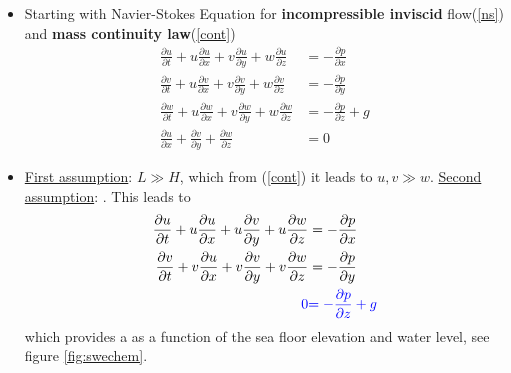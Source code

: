 \begin{frame}
\vspace{-3mm}
\begin{itemize}
\item<2-> Starting with Navier-Stokes Equation for \textbf{incompressible inviscid} flow(\ref{ns}) and \textbf{mass continuity law}(\ref{cont})
\begin{align}
\frac{\partial u}{\partial t} + u\frac{\partial u}{\partial x} + v\frac{\partial u}{\partial y} + w\frac{\partial u}{\partial z} &= - \frac{\partial p}{\partial x} \nonumber \\ 
\frac{\partial v}{\partial t} + u\frac{\partial v}{\partial x} + v\frac{\partial v}{\partial y} + w\frac{\partial v}{\partial z}&= - \frac{\partial p}{\partial y} \label{ns} \\ 
\frac{\partial w}{\partial t} + u\frac{\partial w}{\partial x} + v\frac{\partial w}{\partial y} + w\frac{\partial w}{\partial z} &= - \frac{\partial p}{\partial z} + g \nonumber\\[0.3cm]
\frac{\partial u}{\partial x} + \frac{\partial v}{\partial y} + \frac{\partial w}{\partial z} &= 0 \label{cont}
\end{align}

\item<3-> \underline{First assumption}: $L \gg H$, which from (\ref{cont}) it leads to $u,v\gg w$. \underline{Second assumption}: . This leads to
\begin{align}
\frac{\partial u}{\partial t} + u\frac{\partial u}{\partial x} + u\frac{\partial v}{\partial y} + u\frac{\partial w}{\partial z} &= - \frac{\partial p}{\partial x} \nonumber \nonumber \\ 
\frac{\partial v}{\partial t} + v\frac{\partial u}{\partial x} + v\frac{\partial v}{\partial y} + v\frac{\partial w}{\partial z}&= - \frac{\partial p}{\partial y} \nonumber \\ 
\textcolor{blue}{0} &\textcolor{blue}{ = - \frac{\partial p}{\partial z} + g} \label{press}
\end{align}
which provides a  as a function of the sea floor elevation and water level, see figure \ref{fig:swechem}.
\end{itemize}
\end{frame}
\clearpage


